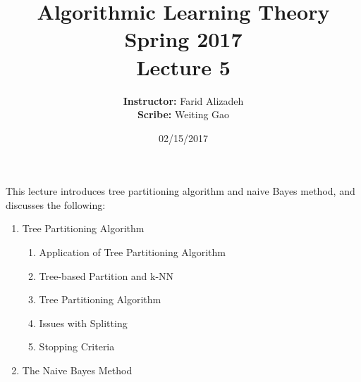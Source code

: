 \documentclass{article}
\title{ 
    Algorithmic Learning Theory\\
    Spring 2017\\
    Lecture 5
}
\author{
    {\bf Instructor:} Farid Alizadeh\\
    {\bf Scribe:} Weiting Gao\\
}
\date{02/15/2017}
\begin{document}
\pagestyle{fancy}



\maketitle

\medskip

This lecture introduces tree partitioning algorithm and naive Bayes method, and discusses the following:
\begin{enumerate}
	\item Tree Partitioning Algorithm
	\begin{enumerate}
		\item Application of Tree Partitioning Algorithm
		\item Tree-based Partition and k-NN
		\item Tree Partitioning Algorithm
		\item Issues with Splitting
		\item Stopping Criteria
	\end{enumerate}
	\item The Naive Bayes Method
\end{enumerate}

\clearpage
\end{document}
